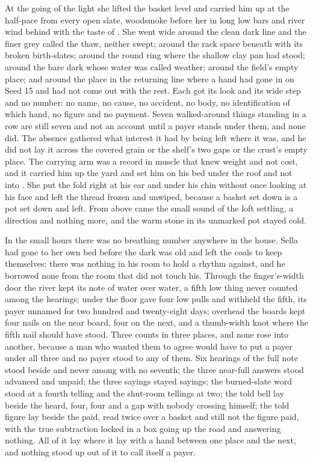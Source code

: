 At the going of the light she lifted the basket level and carried him up  at the half-pace from every open slate, woodsmoke before her in long low bars and river wind behind with the taste of . She went wide around the clean dark line and the finer grey called the thaw, neither swept; around the rack space beneath  with its broken birth-slates; around the round ring where the shallow clay pan had stood; around the bare dark  whose water was called weather; around the field's empty place; and around the place in the returning line where a hand had gone in on Seed 15 and had not come out with the rest. Each got its look and its wide step and no number: no name, no cause, no accident, no body, no identification of which hand, no figure and no payment. Seven walked-around things standing in a row are still seven and not an account until a payer stands under them, and none did. The absence gathered what interest it had by being left where it was, and he did not lay it across the covered grain or the shelf's two gaps or the crust's empty place. The carrying arm was a record in muscle that knew weight and not cost, and it carried him up the yard and set him on his bed under the roof and not into . She put the fold right at his ear and under his chin without once looking at his face and left the thread frozen and unwiped, because a basket set down is a pot set down and left. From above came the small sound of the loft settling, a direction and nothing more, and the warm stone in its unmarked pot stayed cold.

In the small hours there was no breathing number anywhere in the house. Sella had gone to her own bed before the dark was old and left the coals to keep themselves; there was nothing in his room to hold a rhythm against, and he borrowed none from the room that did not touch his. Through the finger's-width door the river kept its note of water over water, a fifth low thing never counted among the hearings; under the floor  gave four low pulls and withheld the fifth, its payer unnamed for two hundred and twenty-eight days; overhead the boards kept four nails on the near board, four on the next, and a thumb-width knot where the fifth nail should have stood. Three counts in three places, and none rose into another, because a man who wanted them to agree would have to put a payer under all three and no payer stood to any of them. Six hearings of the full note stood beside and never among with no seventh; the three near-full answers stood advanced and unpaid; the three sayings stayed sayings; the burned-slate word stood at a fourth telling and the shut-room tellings at two; the told bell lay beside the heard, four, four and a gap with nobody crossing himself; the told figure lay beside the paid, read twice over a basket and still not the figure paid, with the true subtraction locked in a box going up the road and answering nothing. All of it lay where it lay with a hand between one place and the next, and nothing stood up out of it to call itself a payer.

